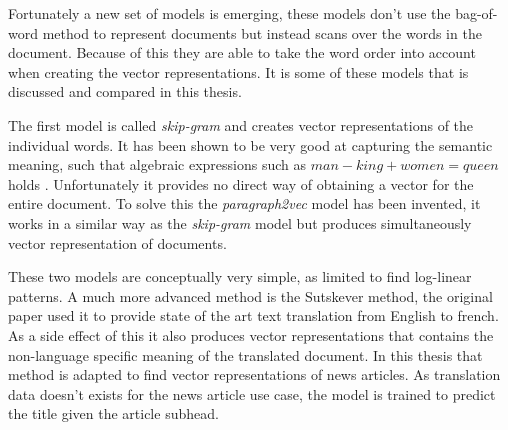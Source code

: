 Fortunately a new set of models is emerging, these models don't use the bag-of-word method to represent documents but instead scans over the words in the document. Because of this they are able to take the word order into account when creating the vector representations. It is some of these models that is discussed and compared in this thesis.

The first model is called \textit{skip-gram} and creates vector representations of the individual words. It has been shown to be very good at capturing the semantic meaning, such that algebraic expressions such as $man - king + women = queen$ holds \cite{word2vec-comparing, word2vec-details}. Unfortunately it provides no direct way of obtaining a vector for the entire document. To solve this the \textit{paragraph2vec} model has been invented, it works in a similar way as the \textit{skip-gram} model but produces simultaneously vector representation of documents.

These two models are conceptually very simple, as limited to find log-linear patterns. A much more advanced method is the Sutskever method, the original paper \cite{sutskever} used it to provide state of the art text translation from English to french. As a side effect of this it also produces vector representations that contains the non-language specific meaning of the translated document. In this thesis that method is adapted to find vector representations of news articles. As translation data doesn't exists for the news article use case, the model is trained to predict the title given the article subhead.
